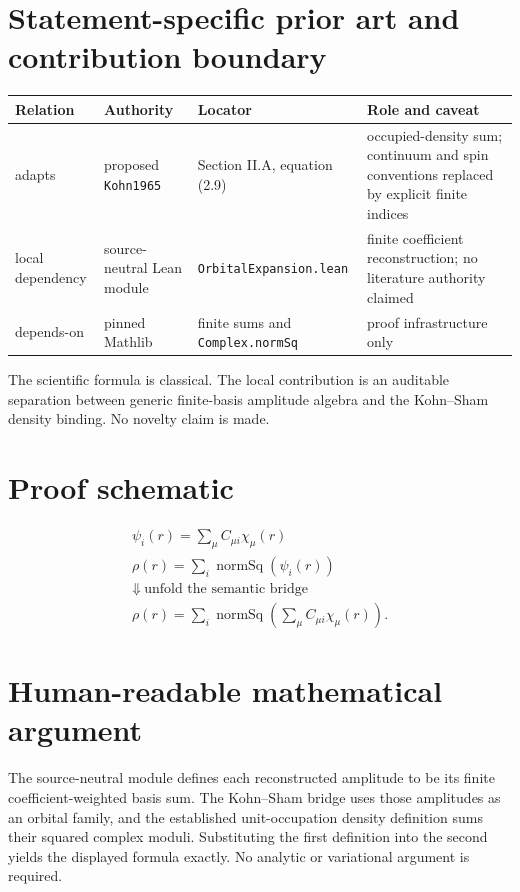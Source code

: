 \section{Statement-specific prior art and contribution boundary}
\begin{tabularx}{\textwidth}{@{}lYYY@{}}
\toprule
Relation & Authority & Locator & Role and caveat \\
\midrule
adapts & proposed \texttt{Kohn1965} & Section II.A, equation (2.9) & occupied-density sum; continuum and spin conventions replaced by explicit finite indices \\
local dependency & source-neutral Lean module & \texttt{OrbitalExpansion.lean} & finite coefficient reconstruction; no literature authority claimed \\
depends-on & pinned Mathlib & finite sums and \texttt{Complex.normSq} & proof infrastructure only \\
\bottomrule
\end{tabularx}
The scientific formula is classical.  The local contribution is an auditable separation between
generic finite-basis amplitude algebra and the Kohn--Sham density binding.  No novelty claim is made.

\section{Proof schematic}
\[
\begin{array}{c}
 \psi_i(r)=\sum_\mu C_{\mu i}\chi_\mu(r)\\[2mm]
 \rho(r)=\sum_i \operatorname{normSq}(\psi_i(r))\\
 \Downarrow\ \text{unfold the semantic bridge}\\
 \rho(r)=\sum_i\operatorname{normSq}\!\left(\sum_\mu C_{\mu i}\chi_\mu(r)\right).
\end{array}
\]

\section{Human-readable mathematical argument}
The source-neutral module defines each reconstructed amplitude to be its finite coefficient-weighted
basis sum.  The Kohn--Sham bridge uses those amplitudes as an orbital family, and the established
unit-occupation density definition sums their squared complex moduli.  Substituting the first
definition into the second yields the displayed formula exactly.  No analytic or variational
argument is required.

